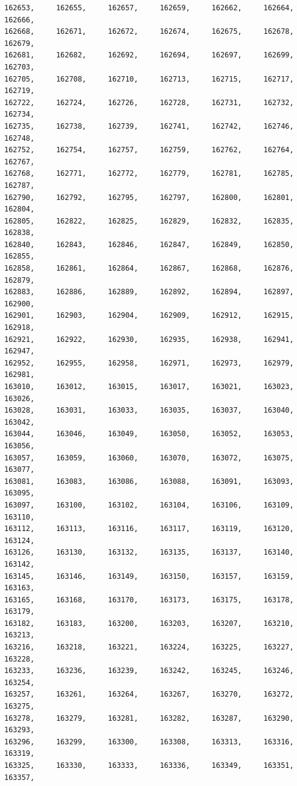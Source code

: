 \documentclass[a4paper,11pt]{report}
\begin{document}
\begin{verbatim}
162653,     162655,     162657,     162659,     162662,     162664,     162666,
162668,     162671,     162672,     162674,     162675,     162678,     162679,
162681,     162682,     162692,     162694,     162697,     162699,     162703,
162705,     162708,     162710,     162713,     162715,     162717,     162719,
162722,     162724,     162726,     162728,     162731,     162732,     162734,
162735,     162738,     162739,     162741,     162742,     162746,     162748,
162752,     162754,     162757,     162759,     162762,     162764,     162767,
162768,     162771,     162772,     162779,     162781,     162785,     162787,
162790,     162792,     162795,     162797,     162800,     162801,     162804,
162805,     162822,     162825,     162829,     162832,     162835,     162838,
162840,     162843,     162846,     162847,     162849,     162850,     162855,
162858,     162861,     162864,     162867,     162868,     162876,     162879,
162883,     162886,     162889,     162892,     162894,     162897,     162900,
162901,     162903,     162904,     162909,     162912,     162915,     162918,
162921,     162922,     162930,     162935,     162938,     162941,     162947,
162952,     162955,     162958,     162971,     162973,     162979,     162981,
163010,     163012,     163015,     163017,     163021,     163023,     163026,
163028,     163031,     163033,     163035,     163037,     163040,     163042,
163044,     163046,     163049,     163050,     163052,     163053,     163056,
163057,     163059,     163060,     163070,     163072,     163075,     163077,
163081,     163083,     163086,     163088,     163091,     163093,     163095,
163097,     163100,     163102,     163104,     163106,     163109,     163110,
163112,     163113,     163116,     163117,     163119,     163120,     163124,
163126,     163130,     163132,     163135,     163137,     163140,     163142,
163145,     163146,     163149,     163150,     163157,     163159,     163163,
163165,     163168,     163170,     163173,     163175,     163178,     163179,
163182,     163183,     163200,     163203,     163207,     163210,     163213,
163216,     163218,     163221,     163224,     163225,     163227,     163228,
163233,     163236,     163239,     163242,     163245,     163246,     163254,
163257,     163261,     163264,     163267,     163270,     163272,     163275,
163278,     163279,     163281,     163282,     163287,     163290,     163293,
163296,     163299,     163300,     163308,     163313,     163316,     163319,
163325,     163330,     163333,     163336,     163349,     163351,     163357,

\end{verbatim}
\end{document}
